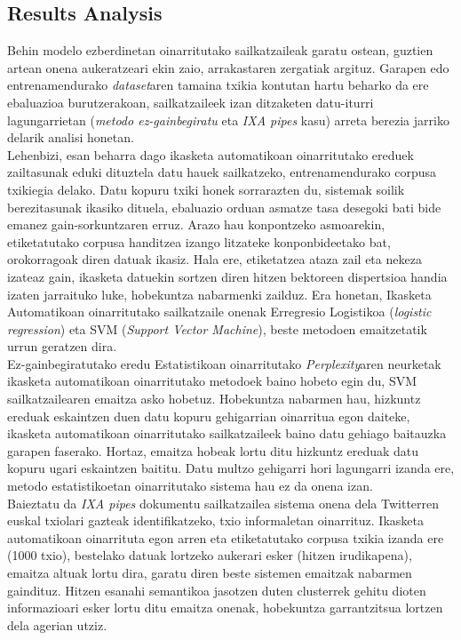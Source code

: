 \documentclass[information,article,submit,moreauthors,pdftex,10pt,a4paper]{Definitions/mdpi}
\begin{document}
\subsection{Results Analysis}\label{sec:sail ond}

\indent Behin modelo ezberdinetan oinarritutako sailkatzaileak garatu ostean, guztien artean onena aukeratzeari ekin zaio, arrakastaren zergatiak argituz. Garapen edo entrenamendurako \textit{dataset}aren tamaina txikia kontutan hartu beharko da ere ebaluazioa burutzerakoan, sailkatzaileek izan ditzaketen datu-iturri lagungarrietan (\textit{metodo ez-gainbegiratu} eta \textit{IXA pipes} kasu) arreta berezia jarriko delarik analisi honetan.\\
\indent Lehenbizi, esan beharra dago ikasketa automatikoan oinarritutako ereduek zailtasunak eduki dituztela datu hauek sailkatzeko, entrenamendurako corpusa txikiegia delako. Datu kopuru txiki honek sorrarazten du, sistemak soilik berezitasunak ikasiko dituela, ebaluazio orduan asmatze tasa desegoki bati bide emanez gain-sorkuntzaren erruz. Arazo hau konpontzeko asmoarekin, etiketatutako corpusa handitzea izango litzateke konponbideetako bat, orokorragoak diren datuak ikasiz. Hala ere, etiketatzea ataza zail eta nekeza izateaz gain, ikasketa datuekin sortzen diren hitzen bektoreen dispertsioa handia izaten jarraituko luke, hobekuntza nabarmenki zailduz. Era honetan, Ikasketa Automatikoan oinarritutako sailkatzaile onenak Erregresio Logistikoa (\textit{logistic regression}) eta SVM (\textit{Support Vector Machine}), beste metodoen emaitzetatik urrun geratzen dira.\\
\indent Ez-gainbegiratutako eredu Estatistikoan oinarritutako \textit{Perplexity}aren neurketak ikasketa automatikoan oinarritutako metodoek baino hobeto egin du, SVM sailkatzailearen emaitza asko hobetuz. Hobekuntza nabarmen hau, hizkuntz ereduak eskaintzen duen datu kopuru gehigarrian oinarritua egon daiteke, ikasketa automatikoan oinarritutako sailkatzaileek baino datu gehiago baitauzka garapen faserako. Hortaz, emaitza hobeak lortu ditu hizkuntz ereduak datu kopuru ugari eskaintzen baititu. Datu multzo gehigarri hori lagungarri izanda ere, metodo estatistikoetan oinarritutako sistema hau ez da onena izan.\\ 
\indent Baieztatu da \textit{IXA pipes} dokumentu sailkatzailea sistema onena dela Twitterren euskal txiolari gazteak identifikatzeko, txio informaletan oinarrituz. Ikasketa automatikoan oinarrituta egon arren eta etiketatutako corpusa txikia izanda ere (1000 txio), bestelako datuak lortzeko aukerari esker (hitzen irudikapena), emaitza altuak lortu dira, garatu diren beste sistemen emaitzak nabarmen gaindituz. Hitzen esanahi semantikoa jasotzen duten clusterrek gehitu dioten informazioari esker lortu ditu emaitza onenak, hobekuntza garrantzitsua lortzen dela agerian utziz.\\
\end{document}
